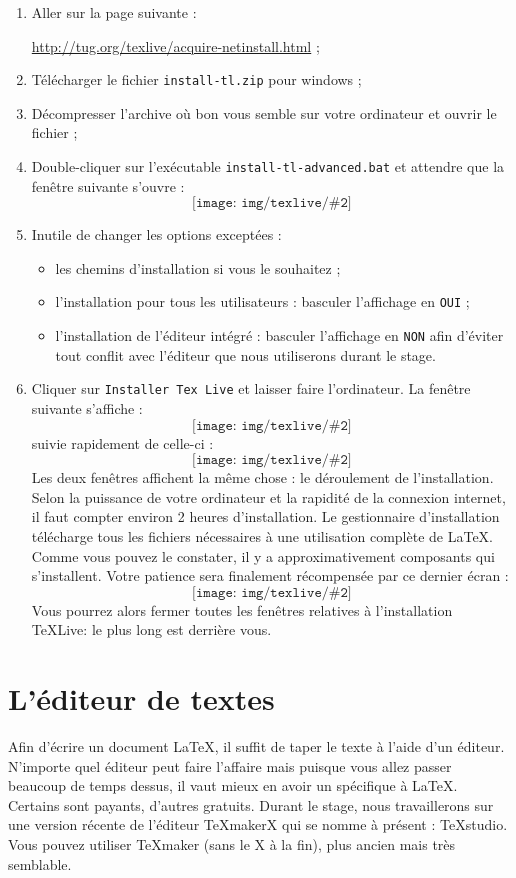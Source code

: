 \documentclass[10pt,openright,oneside,french]{book}
\newcommand{\texlive}{\TeX {\sf Live}\xspace}
\newcommand{\texstudio}{{\sf TeXstudio}\xspace}
\newcommand{\latexinstal}[2][0.5]{\[\texttt{[image: img/texlive/\#2]}\]}
\begin{document}
\begin{enumerate}
    \item Aller sur la page suivante :\par \url{http://tug.org/texlive/acquire-netinstall.html} ;
    \item Télécharger le fichier {\tt install-tl.zip} pour windows ;
    \item Décompresser l'archive où bon vous semble sur votre ordinateur et ouvrir le fichier ;
    \item Double-cliquer sur l’exécutable {\tt install-tl-advanced.bat} et attendre que la fenêtre suivante s'ouvre :
    \latexinstal[1]{config_installation_texlive}
    \item Inutile de changer les options exceptées :
     \begin{itemize}
        	\item les chemins d'installation si vous le souhaitez ;
        	\item l'installation pour tous les utilisateurs : basculer l'affichage en {\tt OUI} ;
        	\item l'installation de l'éditeur intégré : basculer l'affichage en {\tt NON} afin d'éviter tout conflit avec l'éditeur que nous utiliserons durant le stage.
     \end{itemize}
    \item Cliquer sur {\tt Installer Tex Live} et laisser faire l'ordinateur. La fenêtre suivante s'affiche :
       	\latexinstal[0.5]{ecran_noir} suivie rapidement de celle-ci :
       	\latexinstal[0.5]{processus_installation}
    Les deux fenêtres affichent la même chose : le déroulement de l'installation. Selon la puissance de votre ordinateur et la rapidité de la connexion internet, il faut compter environ 2 heures d'installation. Le gestionnaire d'installation télécharge tous les fichiers nécessaires à une utilisation complète de \LaTeX. Comme vous pouvez le constater, il y a approximativement  composants qui s'installent. Votre patience sera finalement récompensée par ce dernier écran :
       	\latexinstal[0.5]{fin_installation} Vous pourrez alors fermer toutes les fenêtres relatives à l'installation \texlive : le plus long est derrière vous.
\end{enumerate}

\section{L'éditeur de textes}

Afin d'écrire un document \LaTeX, il suffit de taper le texte à l'aide d'un éditeur. N'importe quel éditeur peut faire l'affaire mais puisque vous allez passer beaucoup de temps dessus, il vaut mieux en avoir un spécifique à \LaTeX. Certains sont payants, d'autres gratuits. Durant le stage, nous travaillerons sur une version récente de l'éditeur {\sf TeXmakerX} qui se nomme à présent : \texstudio. Vous pouvez utiliser {\sf TeXmaker} (sans le {\sf X} à la fin), plus ancien mais très semblable.
\end{document}
